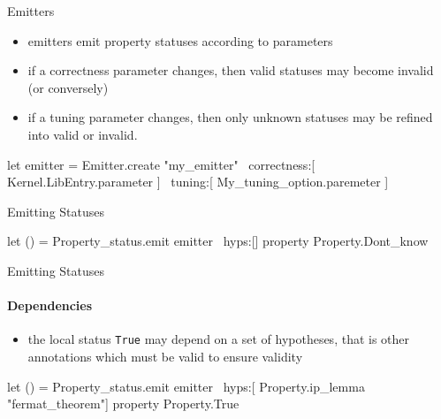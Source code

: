 
\begin{frame}[fragile]{Emitters}

\begin{itemize}
\item emitters emit property statuses according to parameters
\item if a correctness parameter changes, then valid statuses may become invalid
  (or conversely)
\item if a tuning parameter changes, then only unknown statuses may be refined
  into valid or invalid.
\end{itemize}

\begin{ocamlcode}
let emitter = 
  Emitter.create
    "my_emitter"
    ~correctness:[ Kernel.LibEntry.parameter ]
    ~tuning:[ My_tuning_option.paremeter ]
\end{ocamlcode}

\end{frame}


\begin{frame}[fragile]{Emitting Statuses}

\begin{ocamlcode}
let () =
  Property_status.emit
    emitter
    ~hyps:[]
    property
    Property.Dont_know
\end{ocamlcode}

\end{frame}


\begin{frame}[fragile]{Emitting Statuses}
\framesubtitle{Dependencies}

\begin{itemize}
\item the local status \lstinline+True+ may depend on a set of hypotheses, that
  is other annotations which must be valid to ensure validity
\end{itemize}

\begin{ocamlcode}
let () =
  Property_status.emit
    emitter
    ~hyps:[ Property.ip_lemma "fermat_theorem"]
    property
    Property.True
\end{ocamlcode}

\end{frame}


